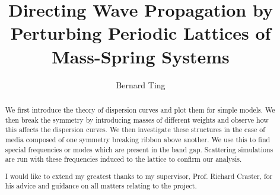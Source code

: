 \documentclass[a4paper, twoside]{report}
\title{Directing Wave Propagation by Perturbing Periodic Lattices of
       Mass-Spring Systems}
\author{Bernard Ting}
\begin{document}


\begin{abstract}
We first introduce the theory of dispersion curves and plot them for simple
models. We then break the symmetry by introducing masses of different weights
and observe how this affects the dispersion curves. We then investigate these
structures in the case of media composed of one symmetry breaking ribbon above
another. We use this to find special frequencies or modes which are present in
the band gap. Scattering simulations are run with these frequencies induced to
the lattice to confirm our analysis.
\end{abstract}

\renewcommand{\abstractname}{Acknowledgements}
\begin{abstract}
I would like to extend my greatest thanks to my supervisor, Prof. Richard Craster, for his advice and guidance on all matters relating to the project.
\end{abstract}

\tableofcontents
\listoffigures
\listoftables











\end{document}
